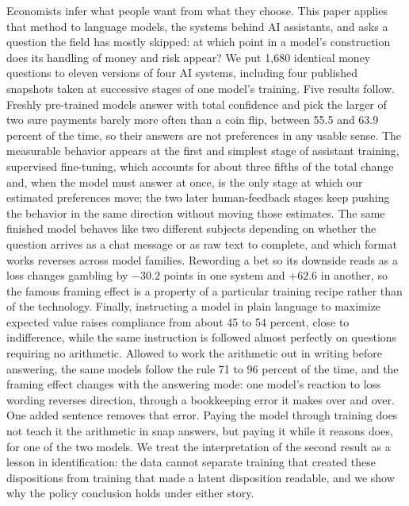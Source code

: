 \documentclass[11pt]{article}
\begin{document}
Economists infer what people want from what they choose. This paper applies that method to
language models, the systems behind AI assistants, and asks a question the field has mostly
skipped: at which point in a model's construction does its handling of money and risk appear?
We put 1{,}680 identical money questions to eleven versions of four AI systems, including four
published snapshots taken at successive stages of one model's training. Five results follow.
Freshly pre-trained models answer with total confidence and pick the larger of two sure payments
barely more often than a coin flip, between 55.5 and 63.9 percent of the time, so their answers
are not preferences in any usable sense. The measurable behavior appears at the first and
simplest stage of assistant training, supervised fine-tuning, which accounts for about three
fifths of the total change and, when the model must answer at once, is the only stage at which our
estimated preferences move; the two later human-feedback stages keep pushing the behavior in the
same direction without moving those estimates. The same finished model behaves like two
different subjects depending on whether the question arrives as a chat message or as raw text to
complete, and which format works reverses across model families. Rewording a bet so its downside
reads as a loss changes gambling by $-30.2$ points in one system and $+62.6$ in another, so the
famous framing effect is a property of a particular training recipe rather than of the
technology. Finally, instructing a model in plain language to maximize expected value raises
compliance from about 45 to 54 percent, close to indifference, while the same instruction is
followed almost perfectly on questions requiring no arithmetic. Allowed to work the arithmetic out
in writing before answering, the same models follow the rule 71 to 96 percent of the time, and the
framing effect changes with the answering mode: one model's reaction to loss wording reverses
direction, through a bookkeeping error it makes over and over. One added sentence removes that
error. Paying the model through training does not teach it the arithmetic in snap answers, but
paying it while it reasons does, for one of the two models. We treat the interpretation of
the second result as a lesson in identification: the data cannot separate training that created
these dispositions from training that made a latent disposition readable, and we show why the
policy conclusion holds under either story.

\normalsize
\vspace{4pt}
\end{document}
